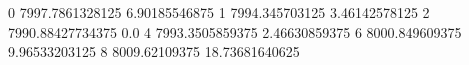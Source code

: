 0 7997.7861328125 6.90185546875
1 7994.345703125 3.46142578125
2 7990.88427734375 0.0
4 7993.3505859375 2.46630859375
6 8000.849609375 9.96533203125
8 8009.62109375 18.73681640625
